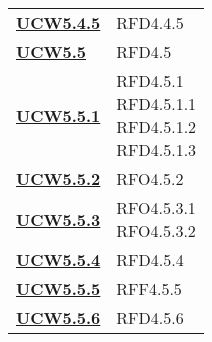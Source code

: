 \begin{longtable}[H]{| >{\centering\bfseries}p{8cm} | >{\centering\arraybackslash}p{8cm} |}
    \hyperref[par:ucw5.4.5]{UCW5.4.5}  & RFD4.4.5                                                                  \\




    \hyperref[ssub:ucw5.5]{UCW5.5}     & RFD4.5                                                                    \\

    \hyperref[par:ucw5.5.1]{UCW5.5.1}  & \makecell{
        \rule{0pt}{4ex}
    RFD4.5.1                                                                                                     \\
    RFD4.5.1.1                                                                                                   \\
    RFD4.5.1.2                                                                                                   \\
    RFD4.5.1.3                                                                                                   \\
        \rule{0pt}{4ex}
    }                                                                                                            \\

    \hyperref[par:ucw5.5.2]{UCW5.5.2}  & RFO4.5.2                                                                  \\

    \hyperref[par:ucw5.5.3]{UCW5.5.3}  & \makecell{
        \rule{0pt}{4ex}
    RFO4.5.3.1                                                                                                   \\
    RFO4.5.3.2                                                                                                   \\
        \rule{0pt}{4ex}
    }                                                                                                            \\

    \hyperref[par:ucw5.5.4]{UCW5.5.4}  & RFD4.5.4                                                                  \\

    \hyperref[par:ucw5.5.5]{UCW5.5.5}  & RFF4.5.5                                                                  \\

    \hyperref[par:ucw5.5.6]{UCW5.5.6}  & RFD4.5.6                                                                  \\


\end{longtable}
